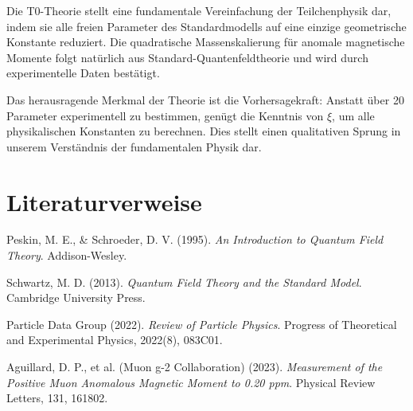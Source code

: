 \documentclass[12pt,a4paper]{article}
\begin{document}
	Die T0-Theorie stellt eine fundamentale Vereinfachung der Teilchenphysik dar, indem sie alle freien Parameter des Standardmodells auf eine einzige geometrische Konstante reduziert. Die quadratische Massenskalierung für anomale magnetische Momente folgt natürlich aus Standard-Quantenfeldtheorie und wird durch experimentelle Daten bestätigt.
	
	Das herausragende Merkmal der Theorie ist die Vorhersagekraft: Anstatt über 20 Parameter experimentell zu bestimmen, genügt die Kenntnis von $\xi$, um alle physikalischen Konstanten zu berechnen. Dies stellt einen qualitativen Sprung in unserem Verständnis der fundamentalen Physik dar.
	
	\section{Literaturverweise}
	
	\begin{thebibliography}{10}
		
		Peskin, M. E., \& Schroeder, D. V. (1995). 
		\textit{An Introduction to Quantum Field Theory}. 
		Addison-Wesley.
		
		Schwartz, M. D. (2013). 
		\textit{Quantum Field Theory and the Standard Model}. 
		Cambridge University Press.
		
		Particle Data Group (2022). 
		\textit{Review of Particle Physics}. 
		Progress of Theoretical and Experimental Physics, 2022(8), 083C01.
		
		Aguillard, D. P., et al. (Muon g-2 Collaboration) (2023). 
		\textit{Measurement of the Positive Muon Anomalous Magnetic Moment to 0.20 ppm}. 
		Physical Review Letters, 131, 161802.
		
	\end{thebibliography}
	
\end{document}
